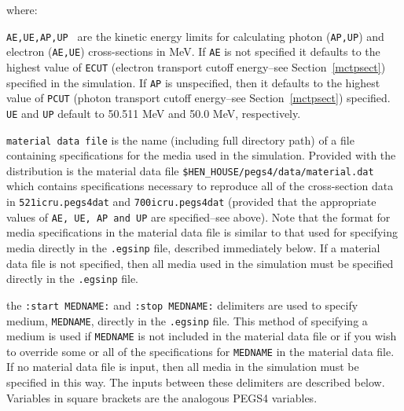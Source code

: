 \documentclass[12pt,twoside]{article}  %
\begin{document}
where:
\begin{description}
\item {\tt AE,UE,AP,UP } are the kinetic energy limits for calculating photon ({\tt AP,UP}) and electron ({\tt AE,UE}) cross-sections in
MeV.  If {\tt AE} is
not specified it defaults to the highest value of {\tt ECUT} (electron transport cutoff energy--see Section~\ref{mctpsect}) specified
in the simulation.  If
{\tt AP} is unspecified, then it defaults to the highest value of {\tt PCUT} (photon transport cutoff energy--see Section~\ref{mctpsect})
specified.  {\tt UE} and {\tt UP} default to 50.511 MeV and 50.0 MeV, respectively.

\item {\tt material data file} is the name (including full directory path) of a file containing specifications for the media used
in the simulation.  Provided with the distribution is the material data file {\tt \$HEN\_HOUSE/pegs4/data/material.dat} which
contains specifications necessary to reproduce all of the cross-section data in {\tt 521icru.pegs4dat} and {\tt 700icru.pegs4dat}
(provided that the appropriate values of {\tt AE, UE, AP and UP} are specified--see above).  Note that the format for
media specifications in the material data file is similar to that used for specifying media directly in the
{\tt .egsinp} file, described immediately below.  If a material data file is not specified, then all media used in the simulation
must be specified directly in the {\tt .egsinp} file.

\item the {\tt :start MEDNAME:} and {\tt :stop MEDNAME:} delimiters are used to specify medium, {\tt MEDNAME}, directly in the
{\tt .egsinp} file.  This method of specifying a medium is used if {\tt MEDNAME} is not included in the material data file or
if you wish to override some or all of the specifications for {\tt MEDNAME} in the material data file.
If no material data file is input, then all media in the simulation
must be specified in this way.  The inputs between these delimiters are described below.  Variables
in square brackets are the analogous PEGS4 variables.


\end{description}
\end{document}
